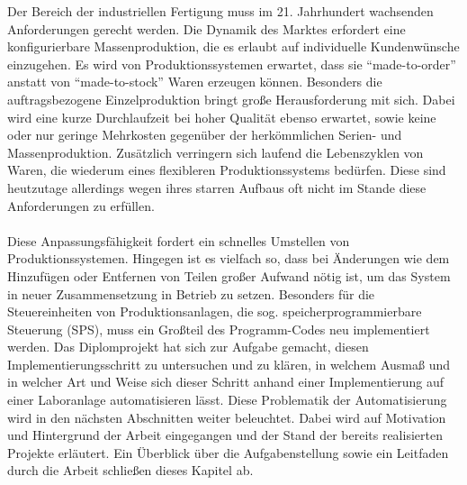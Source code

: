 
Der Bereich der industriellen Fertigung muss im 21. Jahrhundert wachsenden Anforderungen gerecht werden. Die Dynamik des Marktes erfordert eine konfigurierbare Massenproduktion, die es erlaubt auf individuelle Kundenwünsche einzugehen. Es wird von Produktionssystemen erwartet, dass sie "`made-to-order"' anstatt von "`made-to-stock"' Waren erzeugen können. Besonders die auftragsbezogene Einzelproduktion bringt große Herausforderung mit sich. Dabei wird eine kurze Durchlaufzeit bei hoher Qualität ebenso erwartet, sowie keine oder nur geringe Mehrkosten gegenüber der herkömmlichen Serien- und Massenproduktion. Zusätzlich verringern sich laufend die Lebenszyklen von Waren, die wiederum eines flexibleren Produktionssystems bedürfen. Diese sind heutzutage allerdings wegen ihres starren Aufbaus oft nicht im Stande diese Anforderungen zu erfüllen. \cite{wlepuschitz_2014} \\\\
Diese Anpassungsfähigkeit fordert ein schnelles Umstellen von Produktionssystemen. Hingegen ist es vielfach so, dass bei Änderungen wie dem Hinzufügen oder Entfernen von Teilen großer Aufwand nötig ist, um das System in neuer Zusammensetzung in Betrieb zu setzen. Besonders für die Steuereinheiten von Produktionsanlagen, die sog. speicherprogrammierbare Steuerung (SPS), muss ein Großteil des Programm-Codes neu implementiert werden. \cite{Lepuschitz_PhaseAgent}  
Das Diplomprojekt hat sich zur Aufgabe gemacht, diesen Implementierungsschritt zu untersuchen und zu klären, in welchem Ausmaß und in welcher Art und Weise sich dieser Schritt anhand einer Implementierung auf einer Laboranlage automatisieren lässt. 
 Diese Problematik der Automatisierung wird in den nächsten Abschnitten weiter beleuchtet. Dabei wird auf Motivation und Hintergrund der Arbeit eingegangen und der Stand der bereits realisierten Projekte erläutert. Ein Überblick über die Aufgabenstellung sowie ein Leitfaden durch die Arbeit schließen dieses Kapitel ab. 
